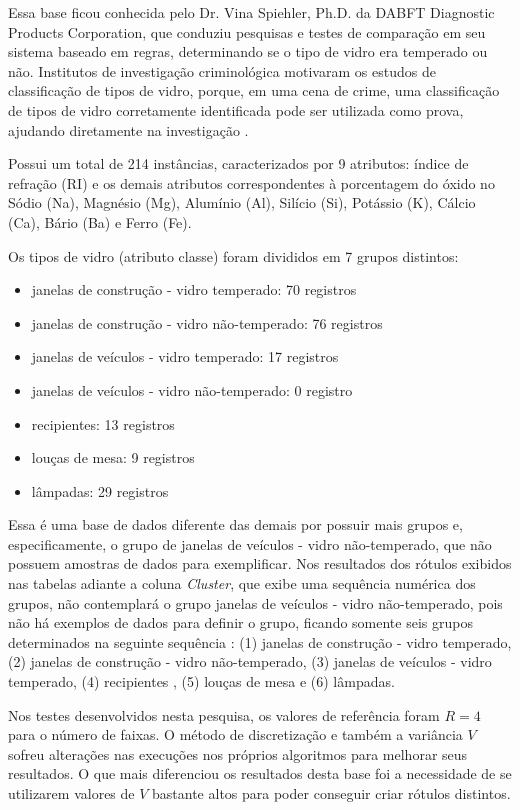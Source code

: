 Essa base ficou conhecida pelo Dr. Vina Spiehler, Ph.D. da DABFT Diagnostic Products Corporation, que conduziu pesquisas e testes de comparação em seu sistema baseado em regras, determinando se o tipo de vidro era temperado ou não. Institutos de investigação criminológica motivaram os estudos de classificação de tipos de vidro, porque, em uma cena de crime, uma classificação de tipos de vidro corretamente identificada pode ser utilizada como prova, ajudando diretamente na investigação \cite{Evett:1989}.

Possui um total de 214 instâncias, caracterizados por 9 atributos: índice de refração (RI) e os demais atributos correspondentes à porcentagem do óxido no Sódio (Na), Magnésio (Mg), Alumínio (Al), Silício (Si), Potássio (K), Cálcio (Ca), Bário (Ba) e Ferro (Fe).

Os tipos de vidro (atributo classe) foram divididos em 7 grupos distintos:
\begin{itemize} [noitemsep]
 \item janelas de construção - vidro temperado: 70 registros
 \item janelas de construção - vidro não-temperado: 76 registros
 \item janelas de veículos - vidro temperado: 17 registros
 \item janelas de veículos - vidro não-temperado: 0 registro
 \item recipientes: 13 registros
 \item louças de mesa: 9 registros
 \item lâmpadas: 29 registros 
\end{itemize}


Essa é uma base de dados diferente das demais por possuir mais grupos e, especificamente, o grupo de janelas de veículos - vidro não-temperado, que não possuem amostras de dados para exemplificar. Nos resultados dos rótulos exibidos nas tabelas adiante a coluna \textit{Cluster}, que exibe uma sequência numérica dos grupos, não contemplará o grupo janelas de veículos - vidro não-temperado, pois não há exemplos de dados para definir o grupo, ficando somente seis grupos determinados na seguinte sequência : (1) janelas de construção - vidro temperado, (2) janelas de construção - vidro não-temperado, (3) janelas de veículos - vidro temperado, (4) recipientes , (5) louças de mesa e (6) lâmpadas. 


Nos testes desenvolvidos nesta pesquisa, os valores de referência foram ${R=4}$ para o número de faixas. O método de discretização e também a variância ${V}$ sofreu alterações nas execuções nos próprios algoritmos para melhorar seus resultados. O que mais diferenciou os resultados desta base foi a necessidade de se utilizarem valores de ${V}$ bastante altos para poder conseguir criar rótulos distintos. 

